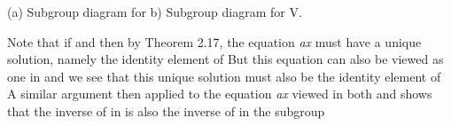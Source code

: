 \documentclass[11pt,oneside]{article}
\begin{document}
\begin{BookBody}
(a) Subgroup diagram for b) Subgroup diagram for V.

Note that if  and  then by Theorem 2.17, the equation\textit{ ax}  must have a unique solution, namely the identity element of  But this equation can also 
be viewed as one in  and we see that this unique solution must also be the identity element  of  A similar argument then applied to the equation\textit{ ax}  viewed in both  and  shows that the inverse  of  in  is also the inverse of  in the subgroup 

\end{BookBody}

\BookNarrativetrue
\end{document}
